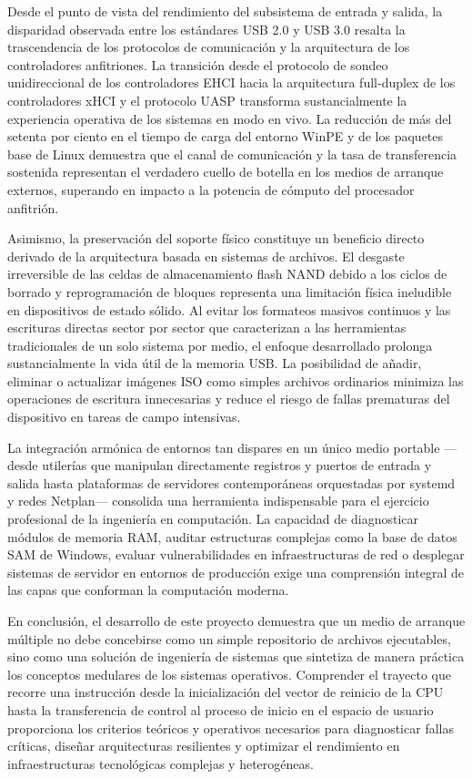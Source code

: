 \documentclass[12pt]{article}
\begin{document}
Desde el punto de vista del rendimiento del subsistema de entrada y salida, la disparidad observada entre los estándares USB 2.0 y USB 3.0 resalta la trascendencia de los protocolos de comunicación y la arquitectura de los controladores anfitriones. La transición desde el protocolo de sondeo unidireccional de los controladores EHCI hacia la arquitectura full-duplex de los controladores xHCI y el protocolo UASP transforma sustancialmente la experiencia operativa de los sistemas en modo en vivo. La reducción de más del setenta por ciento en el tiempo de carga del entorno WinPE y de los paquetes base de Linux demuestra que el canal de comunicación y la tasa de transferencia sostenida representan el verdadero cuello de botella en los medios de arranque externos, superando en impacto a la potencia de cómputo del procesador anfitrión.

Asimismo, la preservación del soporte físico constituye un beneficio directo derivado de la arquitectura basada en sistemas de archivos. El desgaste irreversible de las celdas de almacenamiento flash NAND debido a los ciclos de borrado y reprogramación de bloques representa una limitación física ineludible en dispositivos de estado sólido. Al evitar los formateos masivos continuos y las escrituras directas sector por sector que caracterizan a las herramientas tradicionales de un solo sistema por medio, el enfoque desarrollado prolonga sustancialmente la vida útil de la memoria USB. La posibilidad de añadir, eliminar o actualizar imágenes ISO como simples archivos ordinarios minimiza las operaciones de escritura innecesarias y reduce el riesgo de fallas prematuras del dispositivo en tareas de campo intensivas.

La integración armónica de entornos tan dispares en un único medio portable —desde utilerías que manipulan directamente registros y puertos de entrada y salida hasta plataformas de servidores contemporáneas orquestadas por systemd y redes Netplan— consolida una herramienta indispensable para el ejercicio profesional de la ingeniería en computación. La capacidad de diagnosticar módulos de memoria RAM, auditar estructuras complejas como la base de datos SAM de Windows, evaluar vulnerabilidades en infraestructuras de red o desplegar sistemas de servidor en entornos de producción exige una comprensión integral de las capas que conforman la computación moderna.

En conclusión, el desarrollo de este proyecto demuestra que un medio de arranque múltiple no debe concebirse como un simple repositorio de archivos ejecutables, sino como una solución de ingeniería de sistemas que sintetiza de manera práctica los conceptos medulares de los sistemas operativos. Comprender el trayecto que recorre una instrucción desde la inicialización del vector de reinicio de la CPU hasta la transferencia de control al proceso de inicio en el espacio de usuario proporciona los criterios teóricos y operativos necesarios para diagnosticar fallas críticas, diseñar arquitecturas resilientes y optimizar el rendimiento en infraestructuras tecnológicas complejas y heterogéneas.

\printbibliography[heading=bibintoc, title={Referencias}]
\end{document}
